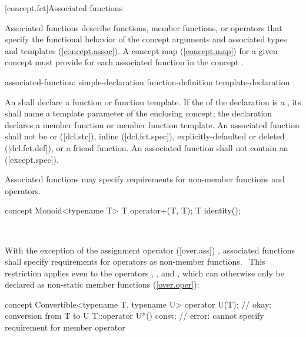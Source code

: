 \documentclass[american]{book}
\begin{document}
\begin{paras}
[concept.fct]{Associated functions}

\pnum
Associated functions describe functions, member functions, or
operators that specify the functional behavior of the concept
arguments and associated types and templates (\ref{concept.assoc}). A
concept map
(\ref{concept.map}) for a given concept must provide for each associated 
function in the concept \addedCC{(\mbox{\ref{concept.map.fct}})}.

\begin{bnf}
associated-function:\br
         simple-declaration\br
         function-definition\br
         template-declaration
\end{bnf}

\pnum An  shall declare a
function or function template. If the  of
the declaration is a , its
 shall name a template parameter of
the enclosing concept; the declaration declares a member function or
member function template. 
%
An associated function shall not be  or 
([dcl.stc]), inline ([dcl.fct.spec]), explicitly-defaulted or deleted
([dcl.fct.def]), or a friend function. An 
associated function shall not contain an
 ([except.spec]).

\pnum
Associated functions may specify requirements for non-member functions and
operators. \enterexample\
\begin{codeblock}
concept Monoid<typename T> {
  T operator+(T, T);
  T identity();
}
\end{codeblock} \exitexample\

\pnum
With the exception of the assignment operator ([over.ass]) 
\addedConcepts{and operators \mbox{\tcode{new}}, \mbox{\tcode{new[]}},
  \mbox{\tcode{delete}}, and \mbox{\tcode{delete[]}}},
associated functions shall specify requirements for operators as non-member 
functions. \enternote\ This restriction applies even to the operators
\tcode{()}, \tcode{[]}, and \tcode{->}, which
can otherwise only be declared as non-static member functions
(\ref{over.oper}): \enterexample\
\begin{codeblock}
concept Convertible<typename T, typename U> {
  operator U(T); // okay: conversion from T to U
  T::operator U*() const; // error: cannot specify requirement for member operator
}
\end{codeblock} \exitexample\ \exitnote\


\end{paras}
\end{document}
